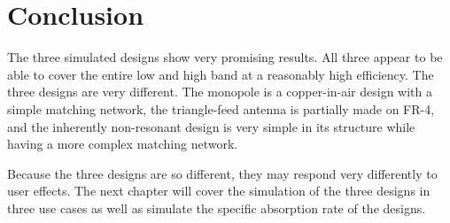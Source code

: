 \section{Conclusion}
The three simulated designs show very promising results. All three appear to be able to cover the entire low and high band at a reasonably high efficiency. The three designs are very different. The monopole is a copper-in-air design with a simple matching network, the triangle-feed antenna is partially made on FR-4, and the inherently non-resonant design is very simple in its structure while having a more complex matching network.

Because the three designs are so different, they may respond very differently to user effects. The next chapter will cover the simulation of the three designs in three use cases as well as simulate the specific absorption rate of the designs.
